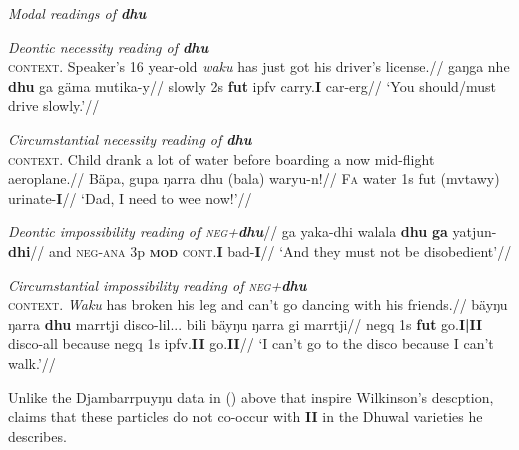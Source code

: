 \pex{}\textit{Modal readings of \textbf{dhu}}




\a\begingl\glpreamble\textit{Deontic necessity reading of \textbf{dhu}}\\\textsc{context.} Speaker's 16 year-old \textit{waku} has just got his driver's license.//
\gla gaŋga nhe \textbf{dhu} ga gäma mutika-y//
\glb slowly 2s \textbf{\gls{fut}} \gls{ipfv} carry.\textbf{I} car-\gls{erg}//
\glft `You should/must drive slowly.'\trailingcitation{[FW?~20180802]}//\endgl
{}


\a{}\begingl\glpreamble \textit{Circumstantial necessity reading of \textbf{dhu}}\\\textsc{context.} Child drank a lot of water before boarding a now mid-flight aeroplane.//
\gla Bäpa, gupa ŋarra dhu (bala) waryu-n!//
\glb \textsc{Fa} water 1s \gls{fut} (\gls{mvtawy}) urinate-\textbf{I}//
\glft`Dad, I need to wee now!'\trailingcitation{[AW 20180830}//\endgl

\a\begingl\glpreamble \textit{Deontic impossibility reading of \textsc{neg+}\textbf{dhu}}//
\gla ga yaka-dhi walala \textbf{dhu} \textbf{ga} yatjun-\textbf{dhi}//
\glb and \textsc{neg-ana} 3p \textsc{\textbf{mod}} \textsc{cont.\textbf{I}} bad-\textbf{I}//
\glft`And they must not be disobedient'//\endgl

\a\begingl\glpreamble\textit{Circumstantial impossibility reading of \textsc{neg}+\textbf{dhu}}\\\textsc{context.} \textit{Waku} has broken his leg and can't go dancing with his friends.//
\gla bäyŋu ŋarra \textbf{dhu} marrtji disco-lil... bili bäyŋu ŋarra gi marrtji//
\glb \gls{negq} 1s \textbf{\gls{fut}} go.\textbf{I|II} disco-\gls{all} because \gls{negq} 1s \gls{ipfv}.\textbf{II} go.\textbf{II}//
\glft`I can't go to the disco because I can't walk.'\trailingcitation{[FW?~20180802]}//\endgl

\xe 


 Unlike the Djambarrpuyŋu data in () above that inspire Wilkinson's descption, \citet[39]{Heath1980b} claims that these particles do not co-occur with \textbf{II} in the Dhuwal varieties he describes.

